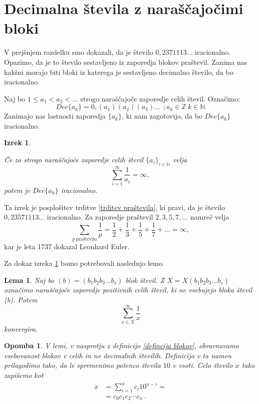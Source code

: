\documentclass[a4paper,12pt]{article}
\def\N{\mathbb{N}} %
\def\Z{\mathbb{Z}} %
\newtheorem{izrek}{Izrek}
\newtheorem{lema}{Lema}
\newtheorem{opomba}{Opomba}
\begin{document}
\section{Decimalna števila z naraščajočimi bloki}

V prejšnjem razdelku smo dokazali, da je število $0,2371113 \dots$ iracionalno.
Opazimo, da je to število
sestavljeno iz zaporedja blokov praštevil. Zanima nas kakšni morajo biti bloki iz katerega je sestavljeno decimalno
število, da bo iracionalno. 

Naj bo $1 \leq a_1 < a_2 < \dots $ strogo naraščajoče zaporedje celih števil. 
Označimo: \[Dec\{a_k\} = 0,(a_1)(a_2)(a_3)... \  \ ;  a_k \in \Z \ k \in \N \]
Zanimajo nas lastnosti zaporedja $\{a_k\}$, ki nam zagotovijo, da bo $Dec\{a_k\}$ iracionalno.


\begin{izrek}\label{irac1}
    
    Če za strogo naraščajoče zaporedje celih števil $\{a_i\}_{i \in \N}$ velja 
    \[ \sum_{i=1}^{\infty} \frac{1}{a_i} = \infty ,\]
    potem je $Dec\{a_k\}$ iracionalno.
\end{izrek}

Ta izrek je posplošitev trditve \ref{trditev praštevila}, ki pravi, da je število $0,23571113 \dots$
iracionalno. Za zaporedje praštevil $2, 3, 5, 7, \dots$ namreč velja
\[
    \sum_{p \ \text{praštevilo}}\frac{1}{p} = \frac{1}{2} + \frac{1}{3} + \frac{1}{5} + \frac{1}{7} + \dots = \infty ,\]
kar je leta 1737 dokazal Leonhard Euler.


Za dokaz izreka \ref{irac1} bomo potrebovali naslednjo lemo.

\begin{lema}
    Naj bo $(b) = (b_1b_2b_3 \dots b_s)$ blok števil. Z $X = X(b_1b_2b_3 \dots b_s)$ označimo
    naraščajoče zaporedje pozitivnih celih števil, ki ne vsebujejo bloka števil (b). Potem 
    \[ \sum_{x \in X}^{\infty} \frac{1}{x}\] konvergira.
\end{lema}

\begin{opomba}
    \label{lema bloki}
    V lemi, v nasprotju z definicijo \ref{defincija blokov}, obravnavamo vsebovanost blokov v celih
    in ne decimalnih številih. Definicijo v ta namen prilagodimo tako, da le spremenimo potenco števila
    $10$ v vsoti. Celo število $x$ tako zapišemo kot 
    \[ 
        \begin{split}
            x & = \sum^n_{i=1} c_i 10^{n-i} = \\
            & = c_0c_1c_2 \cdots c_n \ .
        \end{split} \]
\end{opomba}
\end{document}
